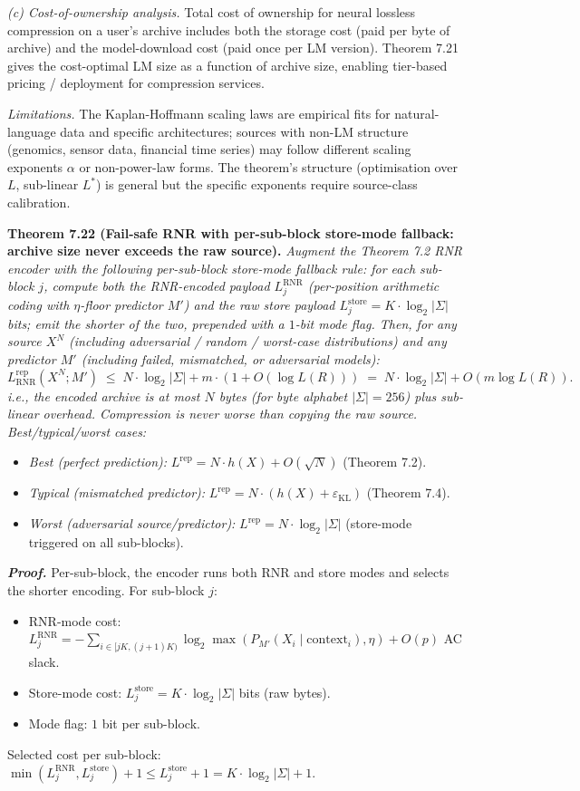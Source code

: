 \documentclass[
]{article}
\begin{document}
\emph{(c) Cost-of-ownership analysis.} Total cost of ownership for
neural lossless compression on a user's archive includes both the
storage cost (paid per byte of archive) and the model-download cost
(paid once per LM version). Theorem 7.21 gives the cost-optimal LM
size as a function of archive size, enabling tier-based pricing /
deployment for compression services.

\emph{Limitations.} The Kaplan-Hoffmann scaling laws are empirical
fits for natural-language data and specific architectures; sources
with non-LM structure (genomics, sensor data, financial time series)
may follow different scaling exponents $\alpha$ or non-power-law
forms. The theorem's structure (optimisation over $L$, sub-linear
$L^*$) is general but the specific exponents require source-class
calibration.

\textbf{Theorem 7.22 (Fail-safe RNR with per-sub-block store-mode
fallback: archive size never exceeds the raw source).}
\emph{Augment the Theorem 7.2 RNR encoder with the following
\emph{per-sub-block store-mode fallback rule}: for each sub-block $j$,
compute both the RNR-encoded payload $L_j^{\mathrm{RNR}}$ (per-position
arithmetic coding with $\eta$-floor predictor $M'$) and the raw store
payload $L_j^{\mathrm{store}} = K \cdot \log_2 |\Sigma|$ bits; emit
the shorter of the two, prepended with a $1$-bit mode flag. Then,
\emph{for any source $X^N$ (including adversarial / random / worst-case
distributions) and any predictor $M'$ (including failed, mismatched,
or adversarial models)}:}
\[
L^{\mathrm{rep}}_{\mathrm{RNR}}(X^N; M')
\;\leq\;
N \cdot \log_2 |\Sigma| + m \cdot (1 + O(\log L(R)))
\;=\;
N \cdot \log_2 |\Sigma| + O(m \log L(R)).
\]
\emph{i.e., the encoded archive is at most $N$ bytes (for byte
alphabet $|\Sigma| = 256$) plus sub-linear overhead. Compression is
never worse than copying the raw source. Best/typical/worst cases:}
\begin{itemize}
\item \emph{Best (perfect prediction):} $L^{\mathrm{rep}} = N \cdot h(X) +
O(\sqrt{N})$ (Theorem 7.2).
\item \emph{Typical (mismatched predictor):} $L^{\mathrm{rep}} = N \cdot
(h(X) + \varepsilon_{\mathrm{KL}})$ (Theorem 7.4).
\item \emph{Worst (adversarial source/predictor):} $L^{\mathrm{rep}} =
N \cdot \log_2 |\Sigma|$ (store-mode triggered on all sub-blocks).
\end{itemize}

\emph{\textbf{Proof.}} Per-sub-block, the encoder runs both RNR and
store modes and selects the shorter encoding. For sub-block $j$:
\begin{itemize}
\item RNR-mode cost: $L_j^{\mathrm{RNR}} = -\sum_{i \in [jK, (j+1)K)}
\log_2 \max(P_{M'}(X_i \mid \text{context}_i), \eta) + O(p)$ AC slack.
\item Store-mode cost: $L_j^{\mathrm{store}} = K \cdot \log_2 |\Sigma|$
bits (raw bytes).
\item Mode flag: $1$ bit per sub-block.
\end{itemize}
Selected cost per sub-block: $\min(L_j^{\mathrm{RNR}}, L_j^{\mathrm{store}}) +
1 \leq L_j^{\mathrm{store}} + 1 = K \cdot \log_2 |\Sigma| + 1$.
\end{document}
